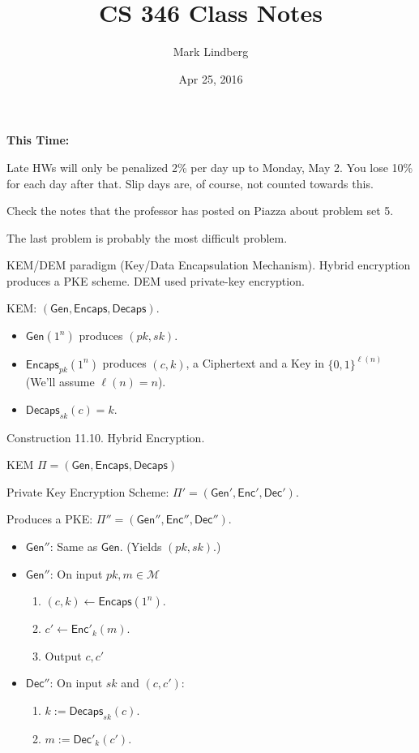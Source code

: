 \documentclass[12pt]{article}
\newcommand{\MMM}{\mathcal{M}}
\newcommand{\Enc}{\mathsf{Enc}}
\newcommand{\Dec}{\mathsf{Dec}}
\newcommand{\Encaps}{\mathsf{Encaps}}
\newcommand{\Decaps}{\mathsf{Decaps}}
\newcommand{\Gen}{\mathsf{Gen}}
\newcommand{\from}{\leftarrow}
\begin{document}
\title{CS 346 Class Notes}
\date{Apr 25, 2016}
\author{Mark Lindberg}
\maketitle
\thispagestyle{fancy}

{\bf This Time:}

Late HWs will only be penalized 2\% per day up to Monday, May 2. You lose 10\% for each day after that. Slip days are, of course, not counted towards this.

Check the notes that the professor has posted on Piazza about problem set 5.

The last problem is probably the most difficult problem.

KEM/DEM paradigm (Key/Data Encapsulation Mechanism). Hybrid encryption produces a PKE scheme. DEM used private-key encryption.

KEM: $(\Gen,\Encaps,\Decaps)$.\begin{itemize}

\item $\Gen(1^n)$ produces $(pk,sk)$.

\item $\Encaps_{pk}(1^n)$ produces $(c,k)$, a Ciphertext and a Key in $\{0,1\}^{\ell(n)}$ (We'll assume $\ell(n)=n$).

\item $\Decaps_{sk}(c)=k$.

\end{itemize}

Construction 11.10. Hybrid Encryption.

KEM $\Pi=(\Gen,\Encaps,\Decaps)$

Private Key Encryption Scheme: $\Pi'=(\Gen',\Enc',\Dec')$.

Produces a PKE: $\Pi''=(\Gen'',\Enc'',\Dec'')$.\begin{itemize}

\item $\Gen''$: Same as $\Gen$. (Yields $(pk,sk)$.)

\item $\Gen''$: On input $pk,m\in\MMM$\begin{enumerate}

\item $(c,k)\from\Encaps(1^n)$.

\item $c'\from\Enc'_k(m)$.

\item Output $c,c'$

\end{enumerate}

\item $\Dec''$: On input $sk$ and $(c,c')$:\begin{enumerate}

\item $k:=\Decaps_{sk}(c)$.

\item $m:=\Dec'_k(c')$.

\end{enumerate}

\end{itemize}
\end{document}
